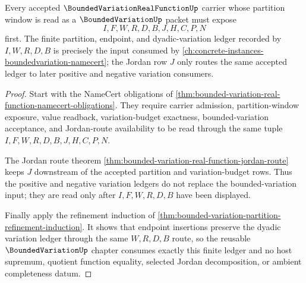 \begin{theorem}
\label{thm:bounded-variation-real-function-ledger-handoff}
Every accepted $\BoundedVariationRealFunctionUp$ carrier whose partition window is read as a $\BoundedVariationUp$ packet must expose
$$
I,F,W,R,D,B,J,H,C,P,N
$$
first. The finite partition, endpoint, and dyadic-variation ledger recorded by $I,W,R,D,B$ is precisely the input consumed by \autoref{ch:concrete-instances-boundedvariation-namecert}; the Jordan row $J$ only routes the same accepted ledger to later positive and negative variation consumers.
\end{theorem}
\begin{proof}
Start with the NameCert obligations of \autoref{thm:bounded-variation-real-function-namecert-obligations}. They require carrier admission, partition-window exposure, value readback, variation-budget exactness, bounded-variation acceptance, and Jordan-route availability to be read through the same tuple $I,F,W,R,D,B,J,H,C,P,N$.

The Jordan route theorem \autoref{thm:bounded-variation-real-function-jordan-route} keeps $J$ downstream of the accepted partition and variation-budget rows. Thus the positive and negative variation ledgers do not replace the bounded-variation input; they are read only after $I,F,W,R,D,B$ have been displayed.

Finally apply the refinement induction of \autoref{thm:bounded-variation-partition-refinement-induction}. It shows that endpoint insertions preserve the dyadic variation ledger through the same $W,R,D,B$ route, so the reusable $\BoundedVariationUp$ chapter consumes exactly this finite ledger and no host supremum, quotient function equality, selected Jordan decomposition, or ambient completeness datum.
\end{proof}



